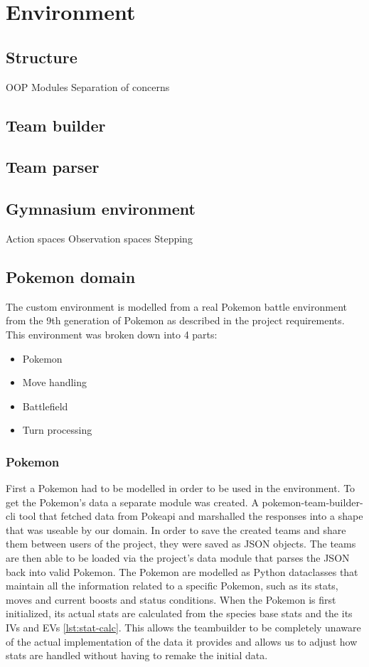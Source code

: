 \section{Environment}
\label{sec:environment}

\subsection{Structure}
OOP
Modules
Separation of concerns

\subsection{Team builder}

\subsection{Team parser}

\subsection{Gymnasium environment}
Action spaces
Observation spaces
Stepping

\subsection{Pokemon domain}
The custom environment is modelled from a real Pokemon battle environment from the 9th generation of Pokemon as described in the project requirements.
This environment was broken down into 4 parts:
\begin{itemize}
    \item Pokemon
    \item Move handling
    \item Battlefield
    \item Turn processing
\end{itemize}

\subsubsection{Pokemon}
First a Pokemon had to be modelled in order to be used in the environment.
To get the Pokemon's data a separate module was created. A pokemon-team-builder-cli \cite{TeambuilderCli} tool that
fetched data from Pokeapi \cite{PokeAPI} and marshalled the responses into a shape that was useable by our domain.
In order to save the created teams and share them between users of the project, they were saved as JSON objects.
The teams are then able to be loaded via the project's data module that parses the JSON back into valid Pokemon.
The Pokemon are modelled as Python dataclasses that maintain all the information related to a specific Pokemon, such as
its stats, moves and current boosts and status conditions. When the Pokemon is first initialized, its actual stats
are calculated from the species base stats and the its IVs and EVs \ref{lst:stat-calc}. This allows the teambuilder to be
completely unaware of the actual implementation of the data it provides and allows us to adjust how stats are handled
without having to remake the initial data. 

